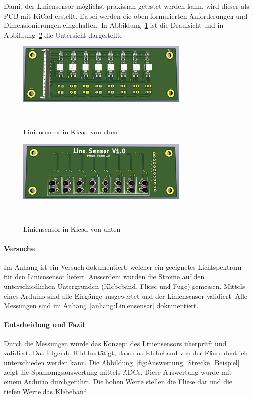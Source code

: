 \documentclass[main.tex]{subfiles} %
\begin{document}
Damit der Liniensensor möglichst praxisnah getestet werden kann, wird dieser
als PCB mit KiCad erstellt. Dabei werden die oben formulierten Anforderungen
und Dimensionierungen eingehalten. In Abbildung~\ref{fig:Liniensensor_Top} ist
die Draufsicht und in Abbildung~\ref{fig:Liniensensor_Bottom} die Untersicht
dargestellt.

\begin{figure}[H]
    \centering
    \includegraphics[width=0.75\textwidth]{fig_Strecke_Tracken/Liniensensor_Top.pdf}
    \caption{Liniensensor in Kicad von oben}~\label{fig:Liniensensor_Top}
\end{figure}

\begin{figure}[H]
    \centering
    \includegraphics[width=0.75\textwidth]{fig_Strecke_Tracken/Liniensensor_Bottom.pdf}
    \caption{Liniensensor in Kicad von unten}~\label{fig:Liniensensor_Bottom}
\end{figure}


\paragraph{Versuche}
Im Anhang ist ein Versuch dokumentiert, welcher ein geeignetes Lichtspektrum
für den Liniensensor liefert. Ausserdem wurden die Ströme auf den
unterschiedlichen Untergründen (Klebeband, Fliese und Fuge) gemessen. Mittels
eines Arduino sind alle Eingänge ausgewertet und der Liniensensor validiert.
Alle Messungen sind im Anhang~\ref{anhang:Liniensensor} dokumentiert.

\paragraph{Entscheidung und Fazit}
Durch die Messungen wurde das Konzept des Liniensensors überprüft und
validiert. Das folgende Bild bestätigt, dass das Klebeband von der Fliese
deutlich unterschieden werden kann. Die
Abbildung~\ref{fig:Auswertung_Strecke_Beispiel} zeigt die Spannungsauswertung
mittels ADCs. Diese Auswertung wurde mit einem Arduino durchgeführt. Die hohen
Werte stellen die Fliese dar und die tiefen Werte das Klebeband.
\end{document}
